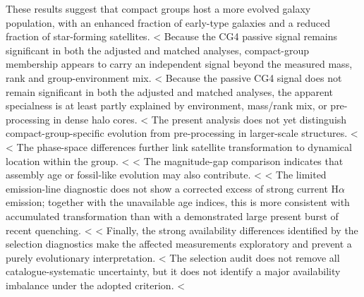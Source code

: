 \documentclass{aa}
\begin{document}
These results suggest that compact groups host a more evolved galaxy population, with an enhanced fraction of early-type galaxies and a reduced fraction of star-forming satellites.
<%
Because the CG4 passive signal remains significant in both the adjusted and matched analyses, compact-group membership appears to carry an independent signal beyond the measured mass, rank and group-environment mix.
<%
Because the passive CG4 signal does not remain significant in both the adjusted and matched analyses, the apparent specialness is at least partly explained by environment, mass/rank mix, or pre-processing in dense halo cores.
<%
The present analysis does not yet distinguish compact-group-specific evolution from pre-processing in larger-scale structures.
<%
<%
The phase-space differences further link satellite transformation to dynamical location within the group.
<%
<%
The magnitude-gap comparison indicates that assembly age or fossil-like evolution may also contribute.
<%
<%
The limited emission-line diagnostic does not show a corrected excess of strong current H\(\alpha\) emission; together with the unavailable age indices, this is more consistent with accumulated transformation than with a demonstrated large present burst of recent quenching.
<%
<%
Finally, the strong availability differences identified by the selection diagnostics make the affected measurements exploratory and prevent a purely evolutionary interpretation.
<%
The selection audit does not remove all catalogue-systematic uncertainty, but it does not identify a major availability imbalance under the adopted criterion.
<%
\end{document}
